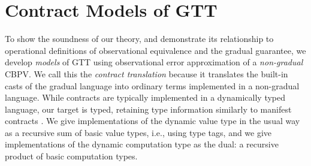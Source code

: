 \documentclass[acmsmall,nonacm]{acmart}
\newcommand{\ltdyn}{\sqsubseteq}
\newcommand{\gtdyn}{\sqsupseteq}
\begin{document}



\section{Contract Models of GTT}
\label{sec:contract}

To show the soundness of our theory, and demonstrate its relationship to
operational definitions of observational equivalence and the gradual
guarantee, we develop \emph{models} of GTT using observational error
approximation of a \emph{non-gradual} CBPV.
%
We call this the \emph{contract translation} because it translates the
built-in casts of the gradual language into ordinary terms implemented
in a non-gradual language.
%
While contracts are typically implemented in a dynamically typed
language, our target is typed, retaining type information similarly to
manifest contracts \cite{greenberg-manifest}.
%
We give implementations of the dynamic value type in the usual way as
a recursive sum of basic value types, i.e., using type tags, and we
give implementations of the dynamic computation type as the dual: a
recursive product of basic computation types.
\end{document}
